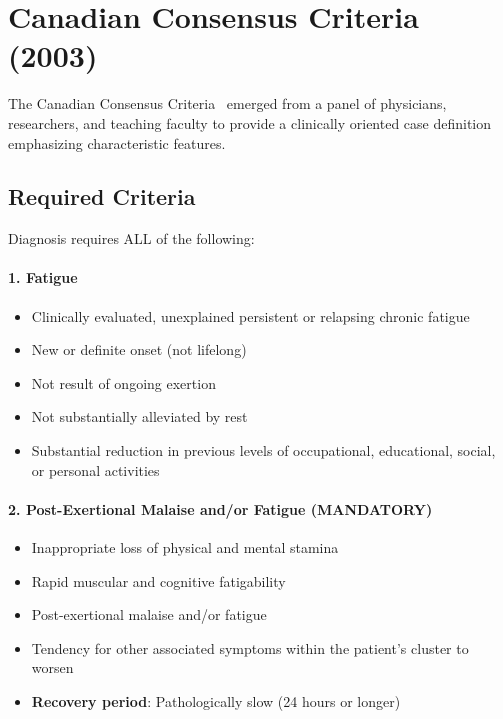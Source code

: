 \section{Canadian Consensus Criteria (2003)}
\label{sec:ccc}

The Canadian Consensus Criteria~\cite{Carruthers2003} emerged from a panel of physicians, researchers, and teaching faculty to provide a clinically oriented case definition emphasizing characteristic features.

\subsection{Required Criteria}

\begin{requirement}
\label{req:ccc-structure}
Diagnosis requires ALL of the following:

\paragraph{1. Fatigue}
\begin{itemize}
    \item Clinically evaluated, unexplained persistent or relapsing chronic fatigue
    \item New or definite onset (not lifelong)
    \item Not result of ongoing exertion
    \item Not substantially alleviated by rest
    \item Substantial reduction in previous levels of occupational, educational, social, or personal activities
\end{itemize}

\paragraph{2. Post-Exertional Malaise and/or Fatigue (MANDATORY)}
\begin{itemize}
    \item Inappropriate loss of physical and mental stamina
    \item Rapid muscular and cognitive fatigability
    \item Post-exertional malaise and/or fatigue
    \item Tendency for other associated symptoms within the patient's cluster to worsen
    \item \textbf{Recovery period}: Pathologically slow (24 hours or longer)
\end{itemize}


\end{requirement}
